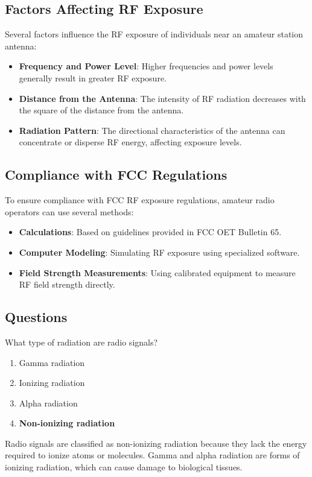 \subsection*{Factors Affecting RF Exposure}
Several factors influence the RF exposure of individuals near an amateur station antenna:
\begin{itemize}
    \item \textbf{Frequency and Power Level}: Higher frequencies and power levels generally result in greater RF exposure.
    \item \textbf{Distance from the Antenna}: The intensity of RF radiation decreases with the square of the distance from the antenna.
    \item \textbf{Radiation Pattern}: The directional characteristics of the antenna can concentrate or disperse RF energy, affecting exposure levels.
\end{itemize}

\subsection*{Compliance with FCC Regulations}
To ensure compliance with FCC RF exposure regulations, amateur radio operators can use several methods:
\begin{itemize}
    \item \textbf{Calculations}: Based on guidelines provided in FCC OET Bulletin 65.
    \item \textbf{Computer Modeling}: Simulating RF exposure using specialized software.
    \item \textbf{Field Strength Measurements}: Using calibrated equipment to measure RF field strength directly.
\end{itemize}

\subsection*{Questions}
\begin{tcolorbox}[colback=gray!10!white,colframe=black!75!black,title={T0C01}]
What type of radiation are radio signals?
\begin{enumerate}[label=\Alph*,noitemsep]
    \item Gamma radiation
    \item Ionizing radiation
    \item Alpha radiation
    \item \textbf{Non-ionizing radiation}
\end{enumerate}
\end{tcolorbox}
Radio signals are classified as non-ionizing radiation because they lack the energy required to ionize atoms or molecules. Gamma and alpha radiation are forms of ionizing radiation, which can cause damage to biological tissues.

